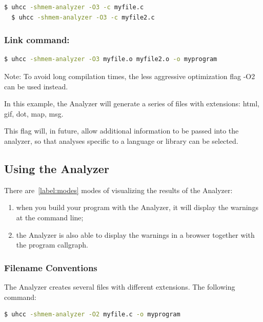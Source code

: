 \begin{lstlisting}[language=bash]
  $ uhcc -shmem-analyzer -O3 -c myfile.c
  $ uhcc -shmem-analyzer -O3 -c myfile2.c
\end{lstlisting}

\subsubsection*{Link command:}

\begin{lstlisting}[language=bash]
  $ uhcc -shmem-analyzer -O3 myfile.o myfile2.o -o myprogram 
\end{lstlisting}

Note: To avoid long compilation times, the less aggressive
optimization flag -O2 can be used instead.

In this example, the \openshmem Analyzer will generate a
series of files with extensions: html, gif, dot, map, msg.

This flag will, in future, allow additional information to be passed
into the analyzer, so that analyses specific to a language or library
can be selected.

\subsection{Using the \openshmem Analyzer}

There are~\ref{label:modes} modes of visualizing the results of the \openshmem
Analyzer:

\begin{enumerate}
\item when you build your program with the \openshmem Analyzer, it
  will display the warnings at the command line;
\item the \openshmem Analyzer is also able to display the warnings in
  a browser together with the program callgraph. \label{label:modes}
\end{enumerate}

\subsubsection{Filename Conventions}

The \openshmem Analyzer creates several files with different extensions. 
The following command:

\begin{lstlisting}[language=bash]
  $ uhcc -shmem-analyzer -O2 myfile.c -o myprogram
\end{lstlisting}

